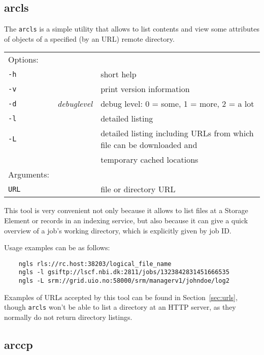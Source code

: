 \subsection{arcls}\label{sec:arcls}
The \texttt{arcls}  is a simple
utility that allows to list contents and view some attributes of
objects of a specified (by an URL) remote directory.

\hspace*{0.5cm}
\begin{shaded}
\end{shaded}
\begin{longtable}{llp{8cm}}
    Options:&&\\
    \texttt{-h} && short help\\
    \texttt{-v} && print version information\\
    \texttt{-d} & \textit{debuglevel} &debug level: 0 = some, 1 = more, 2 = a lot \\
    \texttt{-l} &  & detailed listing\\
    \texttt{-L} &  & detailed listing including URLs from which file can 
    be downloaded and\\ & & temporary cached locations\\
    Arguments:&&\\
    \texttt{URL} && file or directory URL\\
\end{longtable}

This tool is very convenient not only because it allows to list files
at a Storage Element or records in an indexing service, but also
because it can give a quick overview of a job's working directory,
which is explicitly given by job ID.

Usage examples can be as follows:

\begin{verbatim}
    ngls rls://rc.host:38203/logical_file_name
    ngls -l gsiftp://lscf.nbi.dk:2811/jobs/1323842831451666535
    ngls -L srm://grid.uio.no:58000/srm/managerv1/johndoe/log2
\end{verbatim}

Examples of URLs accepted by this tool can be found in
Section~\ref{sec:urls}, though \texttt{arcls} won't be able to list a
directory at an HTTP server, as they normally do not return directory
listings.

\subsection{arccp}\label{sec:arccp}

